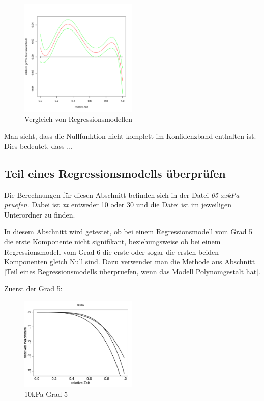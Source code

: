 \documentclass[12pt,a4paper]{article}
\theoremstyle{definition}
\theoremstyle{definition}
\theoremstyle{definition}
\theoremstyle{definition}
\begin{document}
\begin{figure}[H] 
  \centering
     \includegraphics[width=0.5\textwidth]{Vergleich-10vs30kPa-poly5-KB}
  \caption{Vergleich von Regressionsmodellen}
  \label{fig:10}
\end{figure}

Man sieht, dass die Nullfunktion nicht komplett im Konfidenzband enthalten ist. Dies bedeutet, dass ...


\subsection{Teil eines Regressionsmodells überprüfen}
Die Berechnungen für diesen Abschnitt befinden sich in der Datei \textit{05-xxkPa-pruefen}. Dabei ist \textit{xx} entweder 10 oder 30 und die Datei ist im jeweiligen Unterordner zu finden.

In diesem Abschnitt wird getestet, ob bei einem Regressionsmodell vom Grad 5 die erste Komponente nicht signifikant, beziehungsweise ob bei einem Regressionsmodell vom Grad 6 die erste oder sogar die ersten beiden Komponenten gleich Null sind. Dazu verwendet man die Methode aus Abschnitt \ref{Teil eines Regressionsmodells überpruefen, wenn das Modell Polynomgestalt hat}.

Zuerst der Grad 5:

\begin{figure}[H] 
  \centering
     \includegraphics[width=0.5\textwidth]{10kPa-Grad-5-KB}
  \caption{10kPa Grad 5}
  \label{10kPa Grad 5}
\end{figure}
\end{document}

